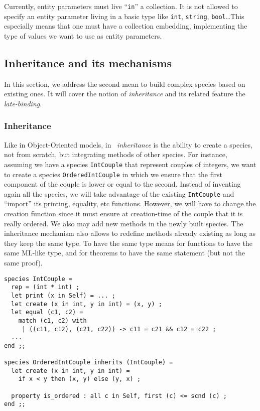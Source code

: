 \smallskip
Currently, entity parameters must live ``{\tt in}'' a collection. It
is not allowed to specify an entity parameter living in a basic type
like {\tt int}, {\tt string}, {\tt bool}\ldots This especially means
that one must have a collection embedding, implementing the type of
values we want to use as entity parameters.



\subsection{Inheritance and its mechanisms}
In this section, we address the second mean to build complex species
based on existing ones. It will cover the notion of {\em inheritance}
and its related feature the {\em late-binding}.



\subsubsection{Inheritance}
\label{inheritance}
Like in Object-Oriented models, in \focal\ {\em inheritance} is the
ability to create a species, not from scratch, but integrating methods
of other species. For instance, assuming we have a species
{\tt IntCouple} that represent couples of integers, we want to create
a species {\tt OrderedIntCouple} in which we ensure that the first
component of the couple is lower or equal to the second. Instead of
inventing again all the species, we will take advantage of the
existing {\tt IntCouple} and ``import'' its printing, equality, etc
functions. However, we will have to change the creation function since
it must ensure at creation-time of the couple that it is really
ordered. We also may add new methods in the newly built species. The
inheritance mechanism also allows to redefine methods already existing
as long as they keep the same type. To have the same type means for
functions to have the same ML-like type, and for theorems to have the
same statement (but not the same proof).
{\scriptsize
\begin{lstlisting}
species IntCouple =
  rep = (int * int) ;
  let print (x in Self) = ... ;
  let create (x in int, y in int) = (x, y) ;
  let equal (c1, c2) =
    match (c1, c2) with
     | ((c11, c12), (c21, c22)) -> c11 = c21 && c12 = c22 ;
  ...
end ;;

species OrderedIntCouple inherits (IntCouple) =
  let create (x in int, y in int) =
    if x < y then (x, y) else (y, x) ;

  property is_ordered : all c in Self, first (c) <= scnd (c) ;
end ;;
\end{lstlisting}
}

